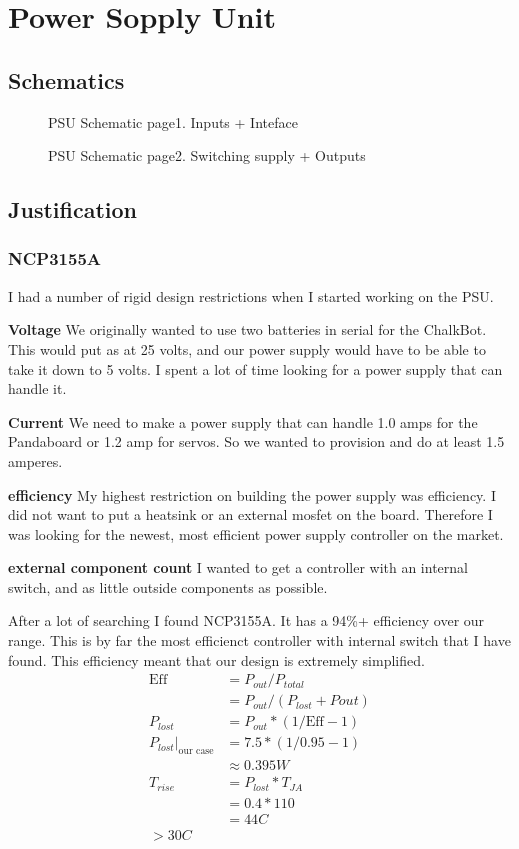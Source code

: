 \documentclass[12pt]{article}
\newcommand{\figuremine}[2]{
\begin{figure}[H]
\noindent\makebox[\textwidth]{
 \texttt{[image: \#1]}}
 \caption{#2}
\end{figure}
}
\begin{document}
\section{Power Sopply Unit}
\subsection{Schematics}
\figuremine{~/ece445/Chalk-Bot/Hardware/Power_board/page1.png}{PSU Schematic page1. Inputs + Inteface}
\figuremine{~/ece445/Chalk-Bot/Hardware/Power_board/page2.png}{PSU Schematic page2. Switching supply + Outputs}
\subsection{Justification}
\subsubsection{NCP3155A}
I had a number of rigid design restrictions when I started working on the PSU. 
\begin{description}
\item{\bf Voltage} We originally wanted to use two batteries in serial for the ChalkBot. This would put as at 25 volts, and our power supply would have to be able to take it down to 5 volts. I spent a lot of time looking for a power supply that can handle it.
\item{\bf Current} We need to make a power supply that can handle 1.0 amps for the Pandaboard or 1.2 amp for servos. So we wanted to provision and do at least 1.5 amperes.
\item{\bf efficiency} My highest restriction on building the power supply was efficiency. I did not want to put a heatsink or an external mosfet on the board. Therefore I was looking for the newest, most efficient power supply controller on the market.
\item{\bf external component count} I wanted to get a controller with an internal switch, and as little outside components as possible.
\end{description}
After a lot of searching I found NCP3155A. It has a 94\%+ efficiency over our range. This is by far the most efficienct controller with internal switch that I have found. This efficiency meant that our design is extremely simplified.
\begin{align}
\text{Eff} &= P_{out} / P_{total}
\\&= P_{out} / (P_{lost} + P{out})
\\ P_{lost} &= P_{out} * (1/\text{Eff} - 1)
\\ P_{lost}|_{\text{our case}} &=  7.5 * (1/0.95 -1)
\\ &\approx 0.395 W
\\ T_{rise} &= P_{lost} * T_{JA}
\\  &= 0.4 * 110
\\  &= 44 C
\\ >30C
\end{align}
\end{document}
